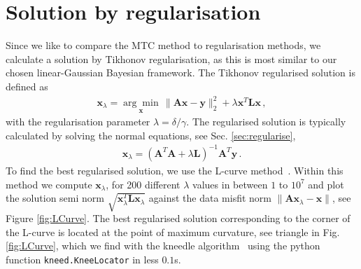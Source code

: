 \section{Solution by regularisation}
\label{sec:reg}
Since we like to compare the MTC method to regularisation methods, we calculate a solution by Tikhonov regularisation, as this is most similar to our chosen linear-Gaussian Bayesian framework.
The Tikhonov regularised solution is defined as~\cite{hansen2010discrete} 
\begin{align}
	\bm{x}_{\lambda} =\underset{ \bm{x}}{\arg \min}\,  \lVert \bm{A}\bm{x} - \bm{y} \rVert_2^2 + \lambda \bm{x}^T \bm{L} \bm{x} \, ,
	\label{eq:XLam}
\end{align}
with the regularisation parameter $\lambda = \delta / \gamma$.
The regularised solution is typically calculated by solving the normal equations, see Sec. \ref{sec:regularise},
\begin{align}
	\bm{x}_{\lambda} = (\bm{A}^T\bm{A} + \lambda \bm{L} )^{-1} \bm{A}^T \bm{y} \label{eq:xLam} \, .
\end{align}
To find the best regularised solution, we use the L-curve method~\cite{hansen1993use}.
Within this method we compute $\bm{x}_\lambda$, for 200 different $\lambda$ values in between $1$ to $10^7$ and plot the solution semi norm $\sqrt{\bm{x}_\lambda^T\mathbf{L} \bm{x}_\lambda}$ against the data misfit norm $\lVert \bm{A}\bm{x}_\lambda - \bm{x} \rVert$, see Figure \ref{fig:LCurve}. 
The best regularised solution corresponding to the corner of the L-curve is located at the point of maximum curvature, see triangle in Fig. \ref{fig:LCurve}, which we find with the kneedle algorithm~\cite{satopaa2011kneedle} using the python function \texttt{kneed.KneeLocator} in less $0.1$s.

